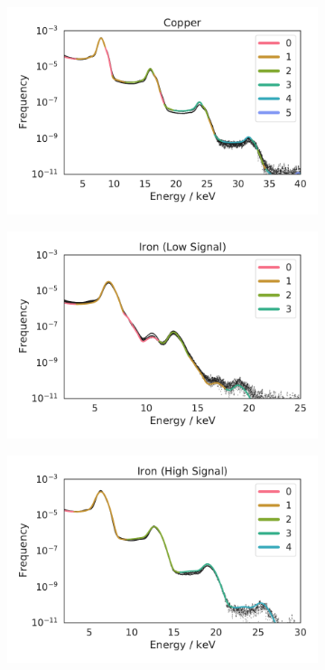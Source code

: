 \begin{figure}[h!]
	\centering
	\begin{subfigure}[b]{0.32\textwidth}
		\includegraphics[width=\linewidth]{images/thresholdsCopperHighNoBeta.pdf}
	\end{subfigure}
	\begin{subfigure}[b]{0.32\textwidth}
		\includegraphics[width=\linewidth]{images/thresholdsIronLow.pdf}
	\end{subfigure}
	\begin{subfigure}[b]{0.32\textwidth}
		\includegraphics[width=\linewidth]{images/thresholdsIronHigh.pdf}

\end{subfigure}
\end{figure}
